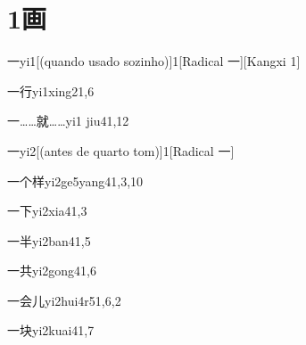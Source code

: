 
\section*{1画}

\begin{verbete}{一}{yi1}[(quando usado sozinho)]{1}[Radical 一][Kangxi 1]
\end{verbete}

\begin{verbete}{一行}{yi1xing2}{1,6}
\end{verbete}

\begin{verbete}{一……就……}{yi1 jiu4}{1,12}
\end{verbete}

\begin{verbete}{一}{yi2}[(antes de quarto tom)]{1}[Radical 一]
\end{verbete}

\begin{verbete}{一个样}{yi2ge5yang4}{1,3,10}
\end{verbete}

\begin{verbete}{一下}{yi2xia4}{1,3}
\end{verbete}

\begin{verbete}{一半}{yi2ban4}{1,5}
\end{verbete}

\begin{verbete}{一共}{yi2gong4}{1,6}
\end{verbete}

\begin{verbete}{一会儿}{yi2hui4r5}{1,6,2}
\end{verbete}

\begin{verbete}{一块}{yi2kuai4}{1,7}
\end{verbete}

